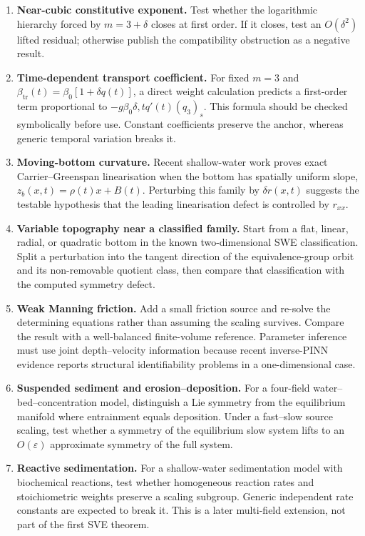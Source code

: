 \documentclass[11pt]{article}
\begin{document}
\begin{enumerate}
\item \textbf{Near-cubic constitutive exponent.}
Test whether the logarithmic hierarchy forced by $m=3+\delta$ closes at first
order.  If it closes, test an $O(\delta^2)$ lifted residual; otherwise publish
the compatibility obstruction as a negative result.

\item \textbf{Time-dependent transport coefficient.}
For fixed $m=3$ and
$\beta_{\mathrm{tr}}(t)=\beta_0[1+\delta q(t)]$, a direct weight calculation
predicts a first-order term proportional to
$-g\beta_0\delta,tq'(t)(q_3)_s$.  This formula should be checked symbolically
before use.  Constant coefficients preserve the anchor, whereas generic temporal
variation breaks it.

\item \textbf{Moving-bottom curvature.}
Recent shallow-water work proves exact Carrier--Greenspan linearisation when the
bottom has spatially uniform slope,
$z_b(x,t)=\rho(t)x+B(t)$.  Perturbing this family by
$\delta r(x,t)$ suggests the testable hypothesis that the leading linearisation
defect is controlled by $r_{xx}$.

\item \textbf{Variable topography near a classified family.}
Start from a flat, linear, radial, or quadratic bottom in the known two-dimensional
SWE classification.  Split a perturbation into the tangent direction of the
equivalence-group orbit and its non-removable quotient class, then compare that
classification with the computed symmetry defect.

\item \textbf{Weak Manning friction.}
Add a small friction source and re-solve the determining equations rather than
assuming the scaling survives.  Compare the result with a well-balanced
finite-volume reference.  Parameter inference must use joint depth--velocity
information because recent inverse-PINN evidence reports structural
identifiability problems in a one-dimensional case.

\item \textbf{Suspended sediment and erosion--deposition.}
For a four-field water--bed--concentration model, distinguish a Lie symmetry from
the equilibrium manifold where entrainment equals deposition.  Under a fast--slow
source scaling, test whether a symmetry of the equilibrium slow system lifts to
an $O(\varepsilon)$ approximate symmetry of the full system.

\item \textbf{Reactive sedimentation.}
For a shallow-water sedimentation model with biochemical reactions, test whether
homogeneous reaction rates and stoichiometric weights preserve a scaling subgroup.
Generic independent rate constants are expected to break it.  This is a later
multi-field extension, not part of the first SVE theorem.
\end{enumerate}
\end{document}
